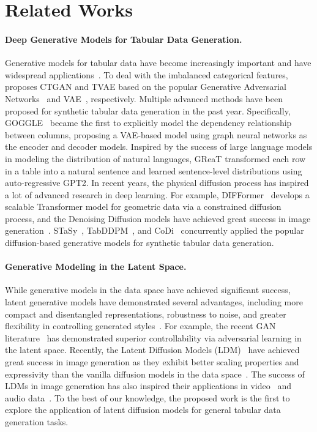 \section{Related Works}
\paragraph{Deep Generative Models for Tabular Data Generation.}
Generative models for tabular data have become increasingly important and have widespread applications~\cite {privacy, TabCSDI, privacy_health}. To deal with the imbalanced categorical features, \citet{ctgan} proposes CTGAN and TVAE based on the popular Generative Adversarial Networks~\citep{gan} and VAE~\citep{vae}, respectively. Multiple advanced methods have been proposed for synthetic tabular data generation in the past year. Specifically, GOGGLE~\citep{goggle} became the first to explicitly model the dependency relationship between columns, proposing a VAE-based model using graph neural networks as the encoder and decoder models. Inspired by the success of large language models in modeling the distribution of natural languages, GReaT transformed each row in a table into a natural sentence and learned sentence-level distributions using auto-regressive GPT2. In recent years, the physical diffusion process has inspired a lot of advanced research in deep learning. For example, DIFFormer~\citep{difformer} develops a scalable Transformer model for geometric data via a constrained diffusion process, and the Denoising Diffusion models have achieved great success in image generation~\citep{ddpm}. STaSy~\citep{stasy}, TabDDPM~\citep{tabddpm}, and CoDi~\citep{codi} concurrently applied the popular diffusion-based generative models for synthetic tabular data generation.
\paragraph{Generative Modeling in the Latent Space.}
While generative models in the data space have achieved significant success, latent generative models have demonstrated several advantages, including more compact and disentangled representations, robustness to noise, and greater flexibility in controlling generated styles~\citep{vq-vae, vq-vae-2, vq-gan}. 
For example, the recent GAN literature~\citep{latent_gan} has demonstrated superior controllability via adversarial learning in the latent space. 
Recently, the Latent Diffusion Models (LDM)~\citep{ldm, sgm} have achieved great success in image generation as they exhibit better scaling properties and expressivity than the vanilla diffusion models in the data space~\citep{ddpm, vp, edm}. The success of LDMs in image generation has also inspired their applications in video~\citep{latent-video} and audio data~\citep{latent-audio}. To the best of our knowledge, the proposed work is the first to explore the application of latent diffusion models for general tabular data generation tasks.
